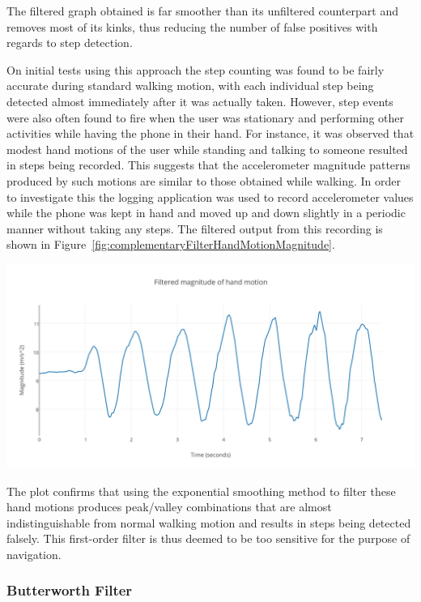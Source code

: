 \documentclass[12pt,a4paper]{report}
\begin{document}
The filtered graph obtained is far smoother than its unfiltered counterpart and removes most of its kinks, thus reducing the number of false positives with regards to step detection.   

On initial tests using this approach the step counting was found to be fairly accurate during standard walking motion, with each individual step being detected almost immediately after it was actually taken. However, step events were also often found to fire when the user was stationary and performing other activities while having the phone in their hand. For instance, it was observed that modest hand motions of the user while standing and talking to someone resulted in steps being recorded. This suggests that the accelerometer magnitude patterns produced by such motions are similar to those obtained while walking. In order to investigate this the logging application was used to record accelerometer values while the phone was kept in hand and moved up and down slightly in a periodic manner without taking any steps. The filtered output from this recording is shown in Figure~\ref{fig:complementaryFilterHandMotionMagnitude}. 

\begin{center}
\includegraphics[scale=0.9]{images/complementaryFilterHandMotionMagnitude.png}
\label{fig:complementaryFilterHandMotionMagnitude}
\end{center}
The plot confirms that using the exponential smoothing method to filter these hand motions produces peak/valley combinations that are almost indistinguishable from normal walking motion and results in steps being detected falsely. This first-order filter is thus deemed to be too sensitive for the purpose of navigation. 

\subsubsection{Butterworth Filter}
\end{document}
